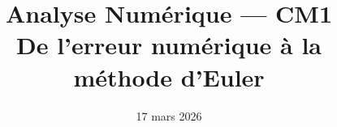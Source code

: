 


\newcommand{\atrou}[2][3cm]{%
  \ifthenelse{\boolean{showSolutions}}{%
    \par\vspace{0.5em}%
    \begin{mdframed}[backgroundcolor=ThemeLight, linewidth=0pt,
      skipabove=0pt, skipbelow=0pt,
      innertopmargin=8pt, innerbottommargin=8pt]%
    #2%
    \end{mdframed}%
    \par\vspace{0.5em}%
  }{%
    \par\vspace{0.5em}%
    \noindent\fbox{\begin{minipage}[c][#1]%
      {\dimexpr\textwidth-2\fboxsep-2\fboxrule\relax}%
      \color{white}\rule{0pt}{0pt}%
    \end{minipage}}%
    \par\vspace{0.5em}%
  }%
}

\newcommand{\val}[1]{%
  \ifthenelse{\boolean{showSolutions}}{#1}{\phantom{#1}}%
}

\newcommand{\esquisse}[1][5.5cm]{%
  \begin{center}%
  \ifthenelse{\boolean{showSolutions}}{%
    \fbox{\begin{minipage}[c][#1]{0.85\textwidth}%
      \centering\vfill
      \textit{\small Croquis réalisé en cours :
      courbe exacte, tangente au point $(t_n,T_n)$,
      pas d'Euler, écart avec la solution.}%
      \vfill
    \end{minipage}}%
  }{%
    \fbox{\begin{minipage}[c][#1]{0.85\textwidth}%
      \hfill\vfill\hfill
    \end{minipage}}%
  }%
  \end{center}%
}

\newcommand{\degC}{\text{\textdegree C}}

\title{\sffamily\bfseries Analyse Numérique --- CM1\\[0.3em]
  \Large De l'erreur numérique à la méthode d'Euler}
\author{}
\date{17 mars 2026}


